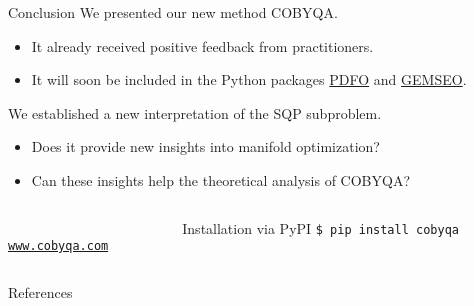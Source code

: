 \documentclass[
]{talk}
\begin{document}
\begin{frame}{Conclusion}
    We presented our new method COBYQA.
    \begin{itemize}
        \item It already received \alert{positive} feedback from practitioners.
        \item It will soon be included in the Python packages \href{https://www.pdfo.net}{PDFO} and \href{https://gemseo.readthedocs.io}{GEMSEO}.
    \end{itemize}

    We established a new interpretation of the SQP subproblem.
    \begin{itemize}
        \item Does it provide new insights into \alert{manifold optimization}?
        \item Can these insights help the theoretical analysis of COBYQA?
    \end{itemize}

    \medskip

    \begin{columns}
        \begin{column}{0.4\textwidth}
            \begin{center}
                \\[1ex]
                \href{https://www.cobyqa.com}{\texttt{www.cobyqa.com}}
            \end{center}
        \end{column}
        \begin{column}{0.6\textwidth}
            \begin{block}{Installation via PyPI}
                \texttt{\$ pip install cobyqa}
            \end{block}
        \end{column}
    \end{columns}
\end{frame}


\appendix
\begin{frame}[t,allowframebreaks]{References}
    \printbibliography[heading=none]
\end{frame}
\end{document}
